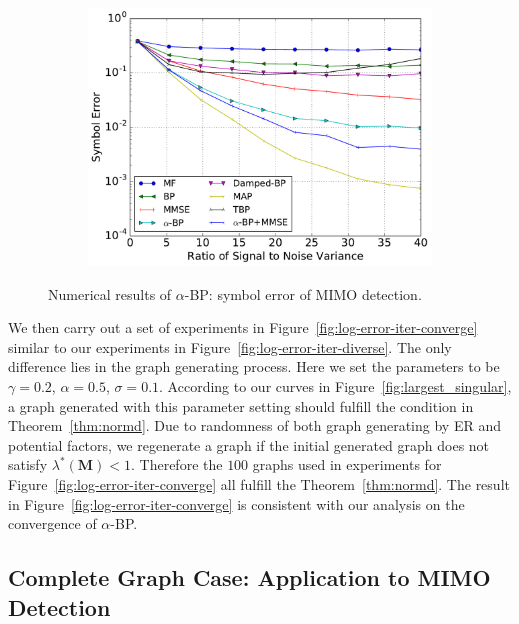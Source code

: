 \begin{figure}[!t]
\begin{subfigure}{0.5\textwidth}
    \includegraphics[width=1\columnwidth]{figures/tbp/mf_tbp_compare.pdf}
    \caption{}
    \label{fig:mimo_c}
  \end{subfigure}
  \caption{Numerical results of $\alpha$-BP: symbol error of MIMO detection.}
  \label{fig:mimo_detection}
\end{figure}

We then carry out a set of experiments in Figure~\ref{fig:log-error-iter-converge} similar to our experiments in Figure~\ref{fig:log-error-iter-diverse}. The only difference lies in the graph generating process. Here we set the parameters to be $\gamma =0.2$, $\alpha = 0.5$, $\sigma = 0.1$. According to our curves in Figure~\ref{fig:largest_singular}, a graph generated with this parameter setting should fulfill the condition in Theorem~\ref{thm:normd}. Due to randomness of both graph generating by ER and potential factors, we regenerate a graph if the initial generated graph does not satisfy $\lambda^{\ast}(\bm{M})<1$. Therefore the $100$ graphs used in experiments for Figure~\ref{fig:log-error-iter-converge} all fulfill the Theorem~\ref{thm:normd}. The result in Figure~\ref{fig:log-error-iter-converge} is consistent with our analysis on the convergence of $\alpha$-BP.



\subsection{Complete Graph Case: Application to MIMO Detection}

